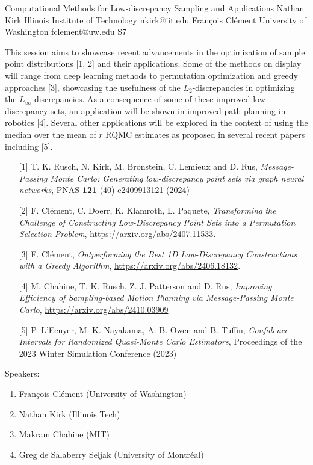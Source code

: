 

\clearpage

\begin{session}
 {Computational Methods for Low-discrepancy Sampling and Applications}%
 {Nathan Kirk}%
 {Illinois Institute of Technology}%
 {nkirk@iit.edu}%
 {François Clément}%
 {University of Washington}%
 {fclement@uw.edu}%
 {S7}%
{}

 This session aims to showcase recent advancements in the optimization of sample point distributions [1, 2] and their applications. Some of the methods on display will range from deep learning methods to permutation optimization and greedy approaches [3], showcasing the usefulness of the $L_2$-discrepancies in optimizing the $L_{\infty}$ discrepancies. As a consequence of some of these improved low-discrepancy sets, an application will be shown in improved path planning in robotics [4]. Several other applications will be explored in the context of using the median over the mean of $r$ RQMC estimates as proposed in several recent papers including [5].
 \medskip
 \begin{enumerate}
 \item[{[1]}] T. K. Rusch, N. Kirk, M. Bronstein, C. Lemieux and D. Rus, \textit{Message-Passing Monte Carlo: Generating low-discrepancy point sets via graph neural networks}, PNAS \textbf{121} (40) e2409913121 (2024)
 \item[{[2]}] F. Clément, C. Doerr, K. Klamroth, L. Paquete, \textit{Transforming the Challenge of Constructing Low-Discrepancy Point Sets into a Permutation Selection Problem}, \url{https://arxiv.org/abs/2407.11533}.
 \item[{[3]}] F. Cl\'ement, \textit{Outperforming the Best {1D} Low-Discrepancy Constructions with a Greedy Algorithm}, \url{https://arxiv.org/abs/2406.18132}.
 \item[{[4]}] M. Chahine, T. K. Rusch, Z. J. Patterson and D. Rus, \textit{Improving Efficiency of Sampling-based Motion Planning via Message-Passing Monte Carlo}, \url{https://arxiv.org/abs/2410.03909}
 \item[{[5]}] P. L'Ecuyer, M. K. Nayakama, A. B. Owen and B. Tuffin, \textit{Confidence Intervals for Randomized Quasi-Monte Carlo Estimators}, Proceedings of the 2023 Winter Simulation Conference (2023)
 \end{enumerate}
 Speakers:
 \begin{enumerate}
 \item François Clément (University of Washington)
 \item Nathan Kirk (Illinois Tech)
 \item Makram Chahine (MIT)
 \item Greg de Salaberry Seljak (University of Montréal)
 \end{enumerate}
\end{session}

